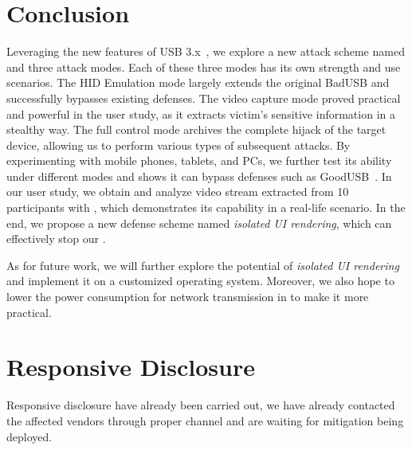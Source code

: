 \section{Conclusion}
\label{sec:conclusion}

Leveraging the new features of USB 3.x~\cite{usb30,usb31,usb32}, we explore a
new attack scheme named \tool and three attack modes. Each of these three modes
has its own strength and use scenarios. The HID Emulation mode largely extends the
original BadUSB and successfully bypasses existing defenses. The video capture mode proved practical and powerful in the user study, as it extracts
victim's sensitive information in a stealthy way. The full control mode
archives the complete hijack of the target device, allowing us to perform various
types of subsequent attacks. By experimenting \tool with mobile phones, tablets,
and PCs, we further test its ability under different modes and shows it can
bypass defenses such as GoodUSB~\cite{tian2015defending}. In our user study, we
obtain and analyze video stream extracted from 10 participants with \tool,
which demonstrates its capability in a real-life scenario. In the end, we
propose a new defense scheme named \textit{isolated UI rendering}, which can
effectively stop our \tool.

As for future work, we will further explore the potential of \textit{isolated UI
rendering} and implement it on a customized operating system. Moreover, we also
hope to lower the power consumption for network transmission in \tool to make
it more practical.

\section{Responsive Disclosure}

Responsive disclosure have already been carried out, we have already contacted the affected vendors through proper channel and are waiting for mitigation being deployed.